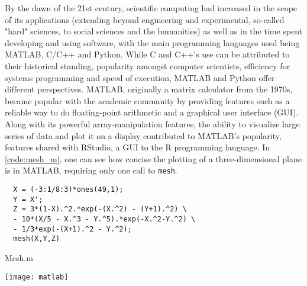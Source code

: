 By the dawn of the 21st century, scientific computing had increased in the scope of its applications (extending beyond engineering and experimental, so-called "hard" sciences, to social sciences and the humanities) as well as in the time spent developing and using software\cite{prabhu_survey_2011}\cite{hannay_how_2009}, with the main programming languages used being MATLAB, C/C++ and Python. While C and C++'s use can be attributed to their historical standing, popularity amongst computer scientists, efficiency for systems programming and speed of execution, MATLAB and Python offer different perspectives. MATLAB, originally a matrix calculator from the 1970s, became popular with the academic community by providing features such as a reliable way to do floating-point arithmetic and a graphical user interface (GUI). Along with its powerful array-manipulation features, the ability to visualize large series of data and plot it on a display contributed to MATLAB's popularity\cite{moler_history_2020}, features shared with RStudio, a GUI to the R programming language. In \ref{code:mesh_m}, one can see how concise the plotting of a three-dimensional plane is in MATLAB, requiring only one call to \lstinline{mesh}.

\begin{listing}

  \begin{verbatim}
  X = (-3:1/8:3)*ones(49,1);
  Y = X';
  Z = 3*(1-X).^2.*exp(-(X.^2) - (Y+1).^2) \
  - 10*(X/5 - X.^3 - Y.^5).*exp(-X.^2-Y.^2) \
  - 1/3*exp(-(X+1).^2 - Y.^2);
  mesh(X,Y,Z)
\end{verbatim}
  \caption{Mesh.m}
  \label{code:mesh_m}
\end{listing}

\texttt{[image: matlab]}

